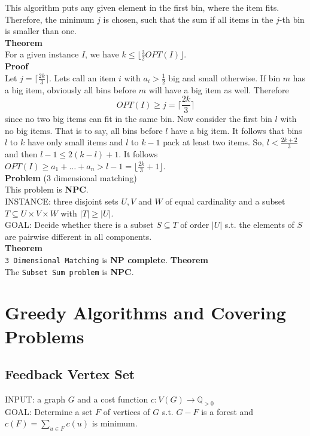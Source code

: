 \documentclass[a4paper, 12pt]{article}
\begin{document}
	This algorithm puts any given element in the first bin, where the item fits. Therefore, the minimum $j$ is chosen, such that the sum if all items in the $j$-th bin is smaller than one.\\
	\textbf{Theorem}\\
	For a given instance $I$, we have $k \leq \lfloor \frac{3}{2} OPT(I) \rfloor$.\\
	\textbf{Proof}\\
	Let $j = \lceil \frac{2k}{3} \rceil$. Lets call an item $i$ with $a_i > \frac{1}{2}$ big and small otherwise. If bin $m$ has a big item, obviously all bins before $m$ will have a big item as well. Therefore \[OPT(I) \geq j = \lceil \frac{2k}{3} \rceil\] since no two big items can fit in the same bin. Now consider the first bin $l$ with no big items. That is to say, all bins before $l$ have a big item. It follows that bins $l$ to $k$ have only small items and $l$ to $k-1$ pack at least two items. So, $l < \frac{2k+2}{3}$ and then $l-1 \leq 2(k-l)+1$. It follows $OPT(I) \geq a_1 + \dots + a_n > l-1 = \lfloor \frac{2k}{3} + 1\rfloor$.\\
	
	\noindent\textbf{Problem} (3 dimensional matching)\\
	This problem is \textbf{NPC}.\\
	INSTANCE: three disjoint sets $U, V$ and $W$ of equal cardinality and a subset $T \subseteq U\times V \times W$ with $\left|T\right| \geq \left|U\right|$.\\
	GOAL: Decide whether there is a subset $S\subseteq T$ of order $\left|U\right|$ s.t. the elements of $S$ are pairwise different in all components.\\
	\textbf{Theorem}\\
	\texttt{3 Dimensional Matching} is \textbf{NP complete}.
	\textbf{Theorem}\\
	The \texttt{Subset Sum problem} is \textbf{NPC}.
	\section{Greedy Algorithms and Covering Problems}
	\subsection{Feedback Vertex Set}
	INPUT: a graph $G$ and a cost function $c: V(G) \to \mathbb{Q}_{>0}$\\
	GOAL: Determine a set $F$ of vertices of $G$ s.t. $G-F$ is a forest and $c(F) = \sum_{u \in F} c(u)$ is minimum.\\
	
\end{document}
